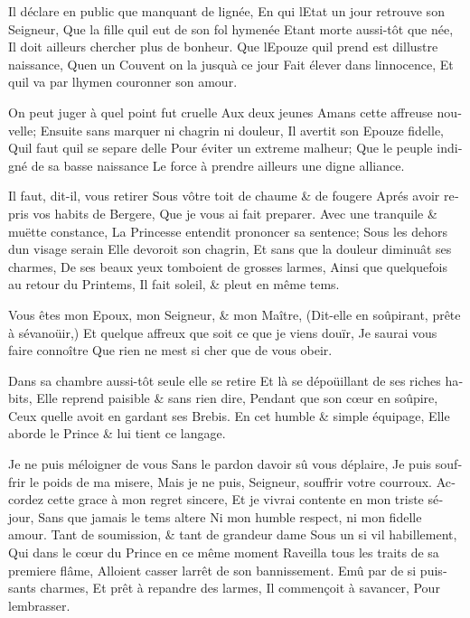 \documentclass[14pt,a4paper]{memoir}
\begin{document}
{{\begin{otherlanguage}{french}
{Il déclare en public que manquant de lignée,} {En qui
l\textquotesingle Etat un jour retrouve son Seigneur,} {Que la fille
qu\textquotesingle il eut de son fol hymenée} {Etant morte aussi-tôt que
née,} {Il doit ailleurs chercher plus de bonheur.} {Que
l\textquotesingle Epouze qu\textquotesingle il prend est
d\textquotesingle illustre naissance,} {Qu\textquotesingle en un Couvent
on l\textquotesingle a jusqu\textquotesingle à ce jour} {Fait élever
dans l\textquotesingle innocence,} {Et qu\textquotesingle il va par
l\textquotesingle hymen couronner son amour.}

{On peut juger à quel point fut cruelle} {Aux deux jeunes Amans cette
affreuse nouvelle;} {Ensuite sans marquer ni chagrin ni douleur,} {Il
avertit son Epouze fidelle,} {Qu\textquotesingle il faut
qu\textquotesingle il se separe d\textquotesingle elle} {Pour éviter un
extreme malheur;} {Que le peuple indigné de sa basse naissance} {Le
force à prendre ailleurs une digne alliance. }

{Il faut, dit-il, vous retirer} {Sous vôtre toit de chaume \& de
fougere} {Aprés avoir repris vos habits de Bergere,} {Que je vous ai
fait preparer.} {Avec une tranquile \& muëtte constance,} {La Princesse
entendit prononcer sa sentence;} {Sous les dehors d\textquotesingle un
visage serain} {Elle devoroit son chagrin,} {Et sans que la douleur
diminuât ses charmes,} {De ses beaux yeux tomboient de grosses larmes,}
{Ainsi que quelquefois au retour du Printems,} {Il fait soleil, \& pleut
en même tems.}

{Vous êtes mon Epoux, mon Seigneur, \& mon Maître,} {(Dit-elle en
soûpirant, prête à s\textquotesingle évanoüir,)} {Et quelque affreux que
soit ce que je viens d\textquotesingle ouïr,} {Je saurai vous faire
connoître} {Que rien ne m\textquotesingle est si cher que de vous
obeir.}

{Dans sa chambre aussi-tôt seule elle se retire} {Et là se dépoüillant
de ses riches habits,} {Elle reprend paisible \& sans rien dire,}
{Pendant que son cœur en soûpire,} {Ceux qu\textquotesingle elle avoit
en gardant ses Brebis.} {En cet humble \& simple équipage,} {Elle aborde
le Prince \& lui tient ce langage. }

{Je ne puis m\textquotesingle éloigner de vous} {Sans le pardon
d\textquotesingle avoir sû vous déplaire,} {Je puis souffrir le poids de
ma misere,} {Mais je ne puis, Seigneur, souffrir votre courroux.}
{Accordez cette grace à mon regret sincere,} {Et je vivrai contente en
mon triste séjour,} {Sans que jamais le tems altere} {Ni mon humble
respect, ni mon fidelle amour.} {Tant de soumission, \& tant de grandeur
d\textquotesingle ame } {Sous un si vil habillement,} {Qui dans le cœur
du Prince en ce même moment} {Raveilla tous les traits de sa premiere
flâme,} {Alloient casser l\textquotesingle arrêt de son bannissement.}
{Emû par de si puissants charmes,} {Et prêt à repandre des larmes,} {Il
commençoit à s\textquotesingle avancer,} {Pour
l\textquotesingle embrasser.}


\end{otherlanguage}}}
\end{document}
